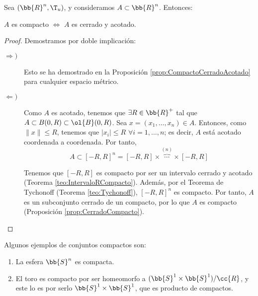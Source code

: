 \begin{coro} \label{coro:HeineBorel}
    Sea $(\bb{R}^n,\T_u)$, y consideramos $A\subset \bb{R}^n$. Entonces:
    \begin{center}
        $A$ es compacto $\Longleftrightarrow$ $A$ es cerrado y acotado.
    \end{center}
\end{coro}
\begin{proof}
    Demostramos por doble implicación:
    \begin{description}
        \item[$\Longrightarrow)$] Esto se ha demostrado en la Proposición \ref{prop:CompactoCerradoAcotado} para cualquier espacio métrico.
        \item[$\Longleftarrow)$] Como $A$ es acotado, tenemos que $\exists R\in \bb{R}^+$ tal que $A\subset B(0,R)\subset \ol{B}(0,R)$. Sea $x=(x_1,\dots,x_n)\in A$.
        Entonces, como $\|x\|\leq R$, tenemos que $|x_i|\leq R$ $\forall i=1,\dots,n$; es decir, $A$ está acotado coordenada a coordenada. Por tanto,
        \begin{equation*}
            A\subset [-R,R]^n = [-R,R] \times \overbrace{\cdots}^{(n)} \times [-R,R]
        \end{equation*}

        Tenemos que $[-R,R]$ es compacto por ser un intervalo cerrado y acotado (Teorema \ref{teo:IntervaloRCompacto}).
        Además, por el Teorema de Tychonoff (Teorema \ref{teo:Tychonoff}), $[-R,R]^n$ es compacto.
        Por tanto, $A$ es un subconjunto cerrado de un compacto, por lo que $A$ es compacto (Proposición \ref{prop:CerradoCompacto}).
    \end{description}
\end{proof}

\begin{ejemplo}
    Algunos ejemplos de conjuntos compactos son:
    \begin{enumerate}
        \item La esfera $\bb{S}^{n}$ es compacta.
        \item El toro es compacto por ser homeomorfo a $(\bb{S}^1\times \bb{S}^1)/\cc{R}$, y este lo es por serlo $\bb{S}^1\times \bb{S}^1$, que es producto de compactos.
    \end{enumerate}
\end{ejemplo}

